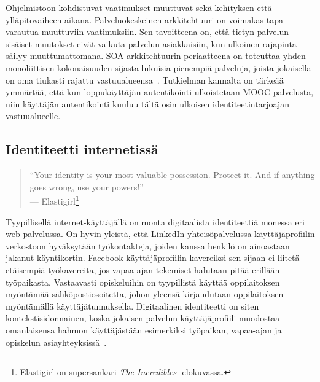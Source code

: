 \documentclass[finnish,gradu]{tktltiki}
\begin{document}
  Ohjelmistoon kohdistuvat vaatimukset muuttuvat sekä kehityksen että ylläpitovaiheen aikana. Palveluokeskeinen arkkitehtuuri on voimakas tapa varautua muuttuviin vaatimuksiin. Sen tavoitteena on, että tietyn palvelun sisäiset muutokset eivät vaikuta palvelun asiakkaisiin, kun ulkoinen rajapinta säilyy muuttumattomana. SOA-arkkitehtuurin periaatteena on toteuttaa yhden monoliittisen kokonaisuuden sijasta lukuisia pienempiä palveluja, joista jokaisella on oma tiukasti rajattu vastuualueensa~\cite{soa_in_practise_2007}. Tutkielman kannalta on tärkeää ymmärtää, että kun loppukäyttäjän autentikointi ulkoistetaan MOOC-palvelusta, niin käyttäjän autentikointi kuuluu tältä osin ulkoisen identiteetintarjoajan vastuualueelle.





  \subsection{Identiteetti internetissä} %
  \label{sub:identiteetti_internetissä}

  \begin{quote}
    ``Your identity is your most valuable possession. Protect it.
    And if anything goes wrong, use your powers!''
    \\--- Elastigirl\footnote{
      Elastigirl on supersankari \emph{The Incredibles} -elokuvassa.
    }
  \end{quote}

  Tyypillisellä internet-käyttäjällä on monta digitaalista identiteettiä monessa eri web-palvelussa. On hyvin yleistä, että LinkedIn-yhteisöpalvelussa käyttäjäprofiilin verkostoon hyväksytään työkontakteja, joiden kanssa henkilö on ainoastaan jakanut käyntikortin. Facebook-käyttäjäprofiilin kavereiksi sen sijaan ei liitetä etäisempiä työkavereita, jos vapaa-ajan tekemiset halutaan pitää erillään työpaikasta. Vastaavasti opiskeluihin on tyypillistä käyttää oppilaitoksen myöntämää sähköpostiosoitetta, johon yleensä kirjaudutaan oppilaitoksen myöntämällä käyttäjätunnuksella. Digitaalinen identiteetti on siten kontekstisidonnainen, koska jokaisen palvelun käyttäjäprofiili muodostaa omanlaisensa hahmon käyttäjästään esimerkiksi työpaikan, vapaa-ajan ja opiskelun asiayhteyksissä~\cite{idwoman_identity_gplus_2011, guardianblog_gplus_id_2011}.
\end{document}
